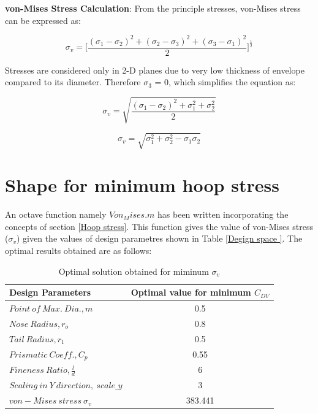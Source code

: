 \textbf{von-Mises Stress Calculation}: From the principle stresses, von-Mises stress can be expressed as:

\begin{equation}
\sigma _{v} = \Bigg[ \frac{(\sigma _{1}  - \sigma _{2})^2 + (\sigma _{2}  - \sigma _{3})^2 + (\sigma _{3}  - \sigma _{1})^2 }{2}   \Bigg]^{\frac{1}{2}}
\end{equation}

Stresses are considered only in 2-D planes due to very low thickness of envelope compared to its diameter. Therefore $ \sigma _{3} $ = 0, which simplifies the equation as:

\begin{equation}
\sigma _{v} = \sqrt{\frac{(\sigma _{1} - \sigma _{2})^{2} + \sigma _{1} ^{2} + \sigma _{2} ^{2}}{2}}
\end{equation}

\begin{equation}
\sigma _{v} = \sqrt{\sigma _{1} ^{2} + \sigma _{2} ^{2} - \sigma _{1} \sigma _{2}}
\end{equation}

\section{Shape for minimum hoop stress}
An octave function namely $ Von_Mises.m $ has been written incorporating the concepts of section \ref{Hoop stress}. This function gives the value of von-Mises stress ($ \sigma _{v} $) given the values of design parametres shown in Table \ref{Degign space }. The optimal results obtained are as follows:
\begin{table}[H]
	\centering
	\caption{Optimal solution obtained for miminum $ \sigma _{v} $}
	\label{Optimal solution obtained for mimimum sigma_v}
	\begin{tabular}{lc}
		\hline \hline
		Design Parameters & Optimal value for minimum $ C_{DV} $    \\ \hline \hline
		
		$ Point\ of\ Max.\ Dia., m$ & 0.5      \\  
		$ Nose\ Radius, r _{o} $ & 0.8    \\
		$ Tail\ Radius, r _{1} $ & 0.5     \\  
		$ Prismatic\ Coeff., C _{p }$ & 0.55 \\
		$ Fineness\ Ratio, \frac{l}{d} $ &6 \\
		$Scaling\ in\ Y\ direction,\ scale\_y$ &3 \\ \hline \hline
		
		$ von-Mises\ stress\  \sigma _{v}  $ & 383.441 \\
		\hline \hline
	\end{tabular}
\end{table}

